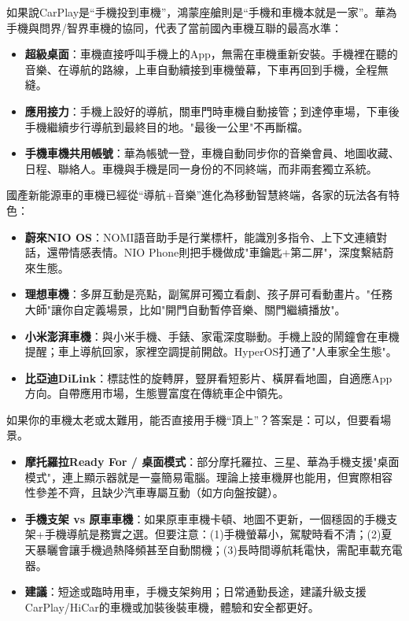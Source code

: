 如果說CarPlay是“手機投到車機”，鴻蒙座艙則是“手機和車機本就是一家”。華為手機與問界/智界車機的協同，代表了當前國內車機互聯的最高水準：

\begin{itemize}
  \item \textbf{超級桌面}：車機直接呼叫手機上的App，無需在車機重新安裝。手機裡在聽的音樂、在導航的路線，上車自動續接到車機螢幕，下車再回到手機，全程無縫。
  \item \textbf{應用接力}：手機上設好的導航，關車門時車機自動接管；到達停車場，下車後手機繼續步行導航到最終目的地。"最後一公里"不再斷檔。
  \item \textbf{手機車機共用帳號}：華為帳號一登，車機自動同步你的音樂會員、地圖收藏、日程、聯絡人。車機與手機是同一身份的不同終端，而非兩套獨立系統。
\end{itemize}


國產新能源車的車機已經從“導航+音樂”進化為移動智慧終端，各家的玩法各有特色：

\begin{itemize}
  \item \textbf{蔚來NIO OS}：NOMI語音助手是行業標杆，能識別多指令、上下文連續對話，還帶情感表情。NIO Phone則把手機做成"車鑰匙+第二屏"，深度繫結蔚來生態。
  \item \textbf{理想車機}：多屏互動是亮點，副駕屏可獨立看劇、孩子屏可看動畫片。"任務大師"讓你自定義場景，比如"開門自動暫停音樂、關門繼續播放"。
  \item \textbf{小米澎湃車機}：與小米手機、手錶、家電深度聯動。手機上設的鬧鐘會在車機提醒；車上導航回家，家裡空調提前開啟。HyperOS打通了"人車家全生態"。
  \item \textbf{比亞迪DiLink}：標誌性的旋轉屏，豎屏看短影片、橫屏看地圖，自適應App方向。自帶應用市場，生態豐富度在傳統車企中領先。
\end{itemize}


如果你的車機太老或太難用，能否直接用手機“頂上”？答案是：可以，但要看場景。

\begin{itemize}
  \item \textbf{摩托羅拉Ready For / 桌面模式}：部分摩托羅拉、三星、華為手機支援"桌面模式"，連上顯示器就是一臺簡易電腦。理論上接車機屏也能用，但實際相容性參差不齊，且缺少汽車專屬互動（如方向盤按鍵）。
  \item \textbf{手機支架 vs 原車車機}：如果原車車機卡頓、地圖不更新，一個穩固的手機支架+手機導航是務實之選。但要注意：(1)手機螢幕小，駕駛時看不清；(2)夏天暴曬會讓手機過熱降頻甚至自動關機；(3)長時間導航耗電快，需配車載充電器。
  \item \textbf{建議}：短途或臨時用車，手機支架夠用；日常通勤長途，建議升級支援CarPlay/HiCar的車機或加裝後裝車機，體驗和安全都更好。
\end{itemize}

